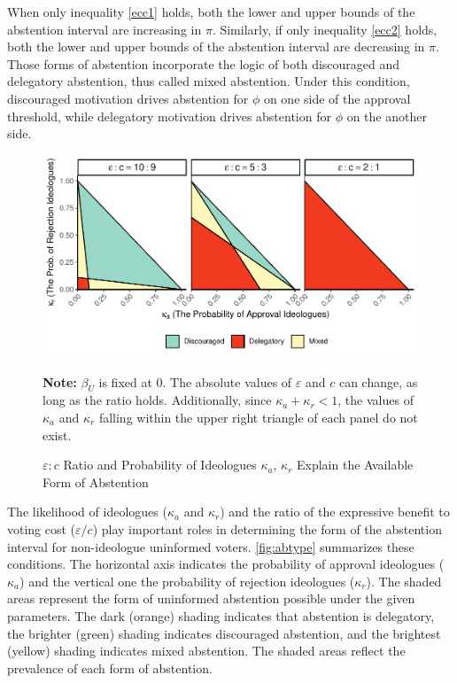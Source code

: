 \documentclass[doc,natbib,12pt]{apa6}
\newcommand{\floatnote}[1]{\vspace{\abovecaptionskip}\caption*{\textbf{Note:} #1}\vspace{-\abovecaptionskip}}
\begin{document}
	\par When only inequality \ref{ecc1} holds, both the lower and upper bounds of the abstention interval are increasing in $\pi$. Similarly, if only inequality \ref{ecc2} holds, both the lower and upper bounds of the abstention interval are decreasing in $\pi$. Those forms of abstention incorporate the logic of both discouraged and delegatory abstention, thus called mixed abstention. Under this condition, discouraged motivation drives abstention for $\phi$ on one side of the approval threshold, while delegatory motivation drives abstention for $\phi$ on the another side.
	
	\begin{figure}[t!]
		\caption{$\varepsilon:c$ Ratio and Probability of Ideologues $\kappa_a$, $\kappa_r$ Explain the Available Form of Abstention}
		\label{fig:abtype}
		\includegraphics[width=\linewidth]{figure/abtype-1}
		\floatnote{$\beta_U$ is fixed at $0$. The absolute values of $\varepsilon$ and $c$ can change, as long as the ratio holds. Additionally, since $\kappa_a + \kappa_r < 1$, the values of $\kappa_a$ and $\kappa_r$ falling within the upper right triangle of each panel do not exist.}
	\end{figure}
	
	\par The likelihood of ideologues ($\kappa_{a}$ and $\kappa_{r}$) and the ratio of the expressive benefit to voting cost ($\varepsilon/c$) play important roles in determining the form of the abstention interval for non-ideologue uninformed voters. \autoref{fig:abtype} summarizes these conditions. The horizontal axis indicates the probability of approval ideologues ($\kappa_a$) and the vertical one the probability of rejection ideologues ($\kappa_r$). The shaded areas represent the form of uninformed abstention possible under the given parameters. The dark (orange) shading indicates that abstention is delegatory, the brighter (green) shading indicates discouraged abstention, and the brightest (yellow) shading indicates mixed abstention. The shaded areas reflect the prevalence of each form of abstention.
	
\end{document}
